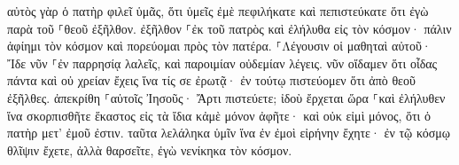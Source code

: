 \documentclass{openreader}
\begin{document}
αὐτὸς γὰρ ὁ πατὴρ φιλεῖ ὑμᾶς, ὅτι ὑμεῖς ἐμὲ πεφιλήκατε καὶ πεπιστεύκατε ὅτι ἐγὼ παρὰ τοῦ ⸀θεοῦ ἐξῆλθον. 
ἐξῆλθον ⸀ἐκ τοῦ πατρὸς καὶ ἐλήλυθα εἰς τὸν κόσμον· πάλιν ἀφίημι τὸν κόσμον καὶ πορεύομαι πρὸς τὸν πατέρα. 
⸀Λέγουσιν οἱ μαθηταὶ αὐτοῦ· Ἴδε νῦν ⸀ἐν παρρησίᾳ λαλεῖς, καὶ παροιμίαν οὐδεμίαν λέγεις. 
νῦν οἴδαμεν ὅτι οἶδας πάντα καὶ οὐ χρείαν ἔχεις ἵνα τίς σε ἐρωτᾷ· ἐν τούτῳ πιστεύομεν ὅτι ἀπὸ θεοῦ ἐξῆλθες. 
ἀπεκρίθη ⸀αὐτοῖς Ἰησοῦς· Ἄρτι πιστεύετε; 
ἰδοὺ ἔρχεται ὥρα ⸀καὶ ἐλήλυθεν ἵνα σκορπισθῆτε ἕκαστος εἰς τὰ ἴδια κἀμὲ μόνον ἀφῆτε· καὶ οὐκ εἰμὶ μόνος, ὅτι ὁ πατὴρ μετ’ ἐμοῦ ἐστιν. 
ταῦτα λελάληκα ὑμῖν ἵνα ἐν ἐμοὶ εἰρήνην ἔχητε· ἐν τῷ κόσμῳ θλῖψιν ἔχετε, ἀλλὰ θαρσεῖτε, ἐγὼ νενίκηκα τὸν κόσμον. 
\end{document}
